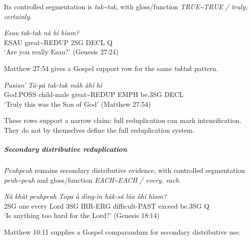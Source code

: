 \documentclass[
  11pt,
  a4paper,
]{article}
\newcommand{\tdim}[1]{\textit{#1}}
\newcommand{\tdimword}[1]{\textit{#1}}
\renewcommand{\textsc}[1]{{\footnotesize\MakeUppercase{#1}}}
\newcommand{\glossquote}[1]{`#1'}
\begin{document}
Its controlled segmentation is \tdim{tak\textasciitilde{}tak}, with
gloss/function \tdim{TRUE\textasciitilde{}TRUE / truly, certainly}.

\begin{exe}
\ex \label{ex:red-taktak-gen27-24}
\gll \tdimword{Esau} \tdimword{tak-tak} \tdimword{nà} \tdimword{hì} \tdimword{hìam?} \\
     \textsc{esau} great\textasciitilde{}REDUP \textsc{2sg} \textsc{decl} \textsc{q} \\
\glt \glossquote{Are you really Esau?} (Genesis 27:24)
\end{exe}

Matthew 27:54 gives a Gospel support row for the same \tdim{taktak}
pattern.

\begin{exe}
\ex \label{ex:red-taktak-matt27-54}
\gll \tdimword{Pasian'} \tdimword{Tá-pà} \tdimword{tak-tak} \tdimword{màh} \tdimword{àhì} \tdimword{hì} \\
     God.\textsc{poss} child-male great\textasciitilde{}REDUP \textsc{emph} be.\textsc{3sg} \textsc{decl} \\
\glt \glossquote{Truly this was the Son of God} (Matthew 27:54)
\end{exe}

These rows support a narrow claim: full reduplication can mark
intensification. They do not by themselves define the full reduplication
system.

\subparagraph{Secondary distributive
reduplication}\label{secondary-distributive-reduplication}

\tdim{Peuhpeuh} remains secondary distributive evidence, with controlled
segmentation \tdim{peuh\textasciitilde{}peuh} and gloss/function
\tdim{EACH\textasciitilde{}EACH / every, each}.

\begin{exe}
\ex \label{ex:red-peuhpeuh-gen18-14}
\gll \tdimword{Nà} \tdimword{khàt} \tdimword{peuhpeuh} \tdimword{Topa} \tdimword{à} \tdimword{dìng-ìn} \tdimword{hàk-sá} \tdimword{lúa} \tdimword{àhì} \tdimword{hìam?} \\
     \textsc{2sg} one every Lord \textsc{3sg} \textsc{irr}-\textsc{erg} difficult-\textsc{past} exceed be.\textsc{3sg} \textsc{q} \\
\glt \glossquote{Is anything too hard for the Lord?} (Genesis 18:14)
\end{exe}

Matthew 10:11 supplies a Gospel comparandum for secondary distributive
use.
\end{document}
